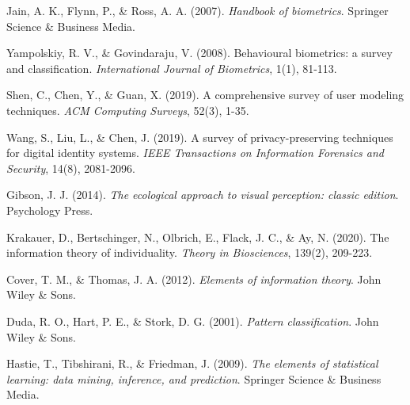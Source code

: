 \documentclass[12pt,a4paper]{article}
\begin{document}

\begin{thebibliography}{9}

Jain, A. K., Flynn, P., \& Ross, A. A. (2007). 
\textit{Handbook of biometrics}. 
Springer Science \& Business Media.

Yampolskiy, R. V., \& Govindaraju, V. (2008). 
Behavioural biometrics: a survey and classification. 
\textit{International Journal of Biometrics}, 1(1), 81-113.

Shen, C., Chen, Y., \& Guan, X. (2019). 
A comprehensive survey of user modeling techniques. 
\textit{ACM Computing Surveys}, 52(3), 1-35.

Wang, S., Liu, L., \& Chen, J. (2019). 
A survey of privacy-preserving techniques for digital identity systems. 
\textit{IEEE Transactions on Information Forensics and Security}, 14(8), 2081-2096.

Gibson, J. J. (2014). 
\textit{The ecological approach to visual perception: classic edition}. 
Psychology Press.

Krakauer, D., Bertschinger, N., Olbrich, E., Flack, J. C., \& Ay, N. (2020). 
The information theory of individuality. 
\textit{Theory in Biosciences}, 139(2), 209-223.

Cover, T. M., \& Thomas, J. A. (2012). 
\textit{Elements of information theory}. 
John Wiley \& Sons.

Duda, R. O., Hart, P. E., \& Stork, D. G. (2001). 
\textit{Pattern classification}. 
John Wiley \& Sons.

Hastie, T., Tibshirani, R., \& Friedman, J. (2009). 
\textit{The elements of statistical learning: data mining, inference, and prediction}. 
Springer Science \& Business Media.

\end{thebibliography}
\end{document}
